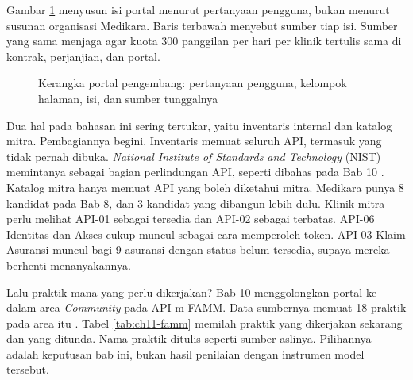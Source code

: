 Gambar \ref{fig:ch11-peta-portal} menyusun isi portal menurut pertanyaan pengguna, bukan menurut susunan organisasi Medikara.
Baris terbawah menyebut sumber tiap isi. Sumber yang sama menjaga agar kuota 300 panggilan per hari per klinik tertulis sama di
kontrak, perjanjian, dan portal.

\begin{figure}[!htb]
  \centering
  
  \caption{Kerangka portal pengembang: pertanyaan pengguna, kelompok halaman, isi, dan sumber tunggalnya}
  \label{fig:ch11-peta-portal}
\end{figure}

Dua hal pada bahasan ini sering tertukar, yaitu inventaris internal dan katalog mitra. Pembagiannya begini. Inventaris
memuat seluruh API, termasuk yang tidak pernah dibuka. \textit{National Institute of Standards and Technology} (NIST) memintanya
sebagai bagian perlindungan API, seperti dibahas pada Bab 10 \cite{nist-sp800-228}. Katalog mitra hanya memuat API yang
boleh diketahui mitra. Medikara punya 8 kandidat pada Bab 8, dan 3 kandidat yang dibangun lebih dulu. Klinik mitra perlu melihat
API-01 sebagai tersedia dan API-02 sebagai terbatas. API-06 Identitas dan Akses cukup muncul sebagai cara memperoleh token.
API-03 Klaim Asuransi muncul bagi 9 asuransi dengan status belum tersedia, supaya mereka berhenti menanyakannya.

Lalu praktik mana yang perlu dikerjakan? Bab 10 menggolongkan portal ke dalam area \textit{Community} pada API-m-FAMM. Data
sumbernya memuat 18 praktik pada area itu \cite{mathijssen2020}. Tabel \ref{tab:ch11-famm} memilah praktik yang dikerjakan
sekarang dan yang ditunda. Nama praktik ditulis seperti sumber aslinya. Pilihannya adalah keputusan bab ini, bukan hasil
penilaian dengan instrumen model tersebut.

